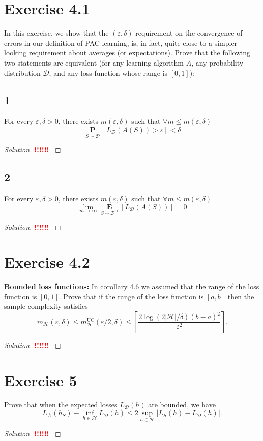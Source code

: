 \documentclass[10pt, a4paper, twoside]{amsart}
\renewcommand{\P}{\operatorname*{\ensuremath{\mathbf{P}}}}
\newcommand{\Ev}{\operatorname*{\ensuremath{\mathbf{E}}}}
\newenvironment{solution}
               {\let\oldqedsymbol=\qedsymbol
                \renewcommand{\qedsymbol}{$\blacktriangleleft$}
                \begin{proof}[Solution]}
               {\end{proof}
                \renewcommand{\qedsymbol}{\oldqedsymbol}}
\newcommand{\TODO}{\textcolor{red}{\textbf{!!!!!! }}}
\begin{document}
\section*{Exercise 4.1}
In this exercise, we show that the $(\varepsilon , \delta )$ requirement on the convergence of errors in our definition of PAC learning, is, in fact, quite close to a simpler looking requirement about averages (or expectations). Prove that the following two statements are equivalent (for any learning algorithm $A$, any probability distribution $\mathcal{D}$, and any loss function whose range is $[0,1]$):
\subsection*{1}
For every $\varepsilon , \delta > 0$, there exists $m(\varepsilon , \delta)$ such that $\forall m \leq m(\varepsilon , \delta)$
\begin{equation*}
\P_{S \sim \mathcal{D}}[L_{\mathcal{D}}(A(S))>\varepsilon]<\delta
\end{equation*}
\begin{solution}
  \TODO
\end{solution}

\subsection*{2}
For every $\varepsilon , \delta > 0$, there exists $m(\varepsilon , \delta)$ such that $\forall m \leq m(\varepsilon , \delta)$
\begin{equation*}
\lim_{m\to \infty}\Ev_{S\sim \mathcal{D}^{m}}[L_{\mathcal{D}}(A(S))] =0
\end{equation*}
\begin{solution}
  \TODO
\end{solution}

\section*{Exercise 4.2}
\textbf{Bounded loss functions:}
In corollary 4.6 we assumed that the range of the loss function is $[0,1]$. Prove that if the range of the loss function is $[a,b]$ then the sample complexity satisfies
\begin{equation*}
  m_{\mathcal{H}}(\varepsilon , \delta) \leq m_{\mathcal{H}}^{\text{UC}}(\varepsilon /2, \delta)
  \leq \left\lceil \frac{2\log (2|\mathcal{H}|/\delta) (b-a)^2}{\varepsilon^2} \right\rceil .
\end{equation*}
\begin{solution}
  \TODO
\end{solution}

\section*{Exercise 5}
Prove that when the expected losses $L_{\mathcal{D}}(h)$ are bounded, we have
\begin{equation*}
  L_{\mathcal{D}}(h_S) - \inf_{h\in \mathcal{H}}L_{\mathcal{D}}(h)
  \leq 2 \sup_{h\in \mathcal{H}}|L_S(h)-L_{\mathcal{D}}(h)|.
\end{equation*}
\begin{solution}
    \TODO
\end{solution}
\end{document}
